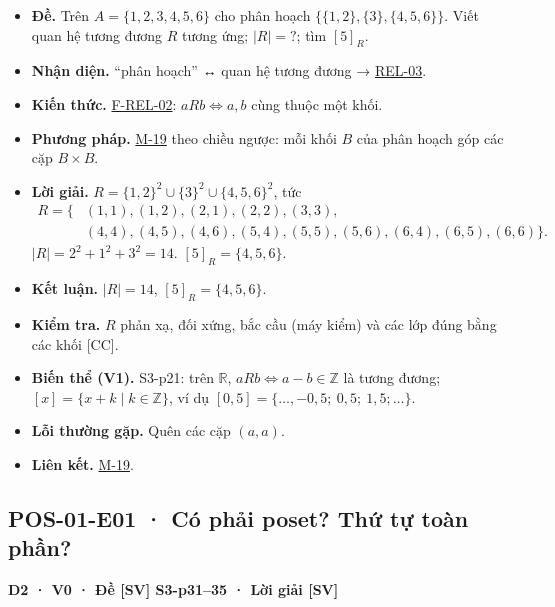 \documentclass[
  10pt,
  twoside,openany]{book}
\providecommand{\tightlist}{%
  \setlength{\itemsep}{0pt}\setlength{\parskip}{0pt}}
\begin{document}
\begin{itemize}
\tightlist
\item
  \textbf{Đề.} Trên \(A=\{1,2,3,4,5,6\}\) cho phân hoạch
  \(\{\{1,2\},\{3\},\{4,5,6\}\}\). Viết quan hệ tương đương \(R\) tương
  ứng; \(|R|=?\); tìm \([5]_R\).
\item
  \textbf{Nhận diện.} ``phân hoạch'' ↔ quan hệ tương đương →
  \protect\hyperlink{REL-03}{REL-03}.
\item
  \textbf{Kiến thức.} \protect\hyperlink{F-REL-02}{F-REL-02}:
  \(aRb\Leftrightarrow a,b\) cùng thuộc một khối.
\item
  \textbf{Phương pháp.} \protect\hyperlink{M-19}{M-19} theo chiều ngược:
  mỗi khối \(B\) của phân hoạch góp các cặp \(B\times B\).
\item
  \textbf{Lời giải.} \(R=\{1,2\}^2\cup\{3\}^2\cup\{4,5,6\}^2\), tức \[
  \begin{aligned}
  R=\{&(1,1),(1,2),(2,1),(2,2),(3,3),\\
  &(4,4),(4,5),(4,6),(5,4),(5,5),(5,6),(6,4),(6,5),(6,6)\}.
  \end{aligned}
  \] \(|R|=2^2+1^2+3^2=14\). \([5]_R=\{4,5,6\}\).
\item
  \textbf{Kết luận.} \(|R|=14\), \([5]_R=\{4,5,6\}\).
\item
  \textbf{Kiểm tra.} \(R\) phản xạ, đối xứng, bắc cầu (máy kiểm) và các
  lớp đúng bằng các khối {[}CC{]}.
\item
  \textbf{Biến thể (V1).} S3-p21: trên \(\mathbb R\),
  \(aRb\Leftrightarrow a-b\in\mathbb Z\) là tương đương;
  \([x]=\{x+k\mid k\in\mathbb Z\}\), ví dụ
  \([0{,}5]=\{\dots,-0{,}5;\ 0{,}5;\ 1{,}5;\dots\}\).
\item
  \textbf{Lỗi thường gặp.} Quên các cặp \((a,a)\).
\item
  \textbf{Liên kết.} \protect\hyperlink{M-19}{M-19}.
\end{itemize}

\hypertarget{POS-01-E01}{%
\subsection{POS-01-E01 · Có phải poset? Thứ tự toàn
phần?}\label{POS-01-E01}}

\textbf{D2 · V0 · Đề {[}SV{]} S3-p31--35 · Lời giải {[}SV{]}}
\end{document}
